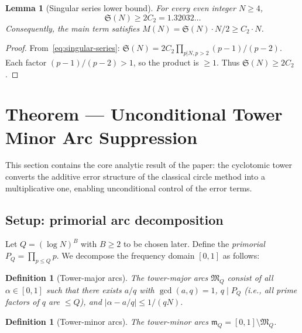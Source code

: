\documentclass[11pt,a4paper]{article}
\newtheorem{lemma}[theorem]{Lemma}
\newtheorem{definition}[theorem]{Definition}
\theoremstyle{remark}
\newcommand{\mM}{\mathfrak{M}}
\newcommand{\mm}{\mathfrak{m}}
\begin{document}
\begin{lemma}[Singular series lower bound]
\label{lem:sing-series-lb}
For every even integer $N \geq 4$,
\begin{equation}
\label{eq:SS-lower-bound}
  \mathfrak{S}(N) \geq 2C_2 = 1.32032\ldots
\end{equation}
Consequently, the main term satisfies
$M(N) = \mathfrak{S}(N) \cdot N/2 \geq C_2 \cdot N$.
\end{lemma}

\begin{proof}
From~\eqref{eq:singular-series}: $\mathfrak{S}(N) = 2C_2 \prod_{p|N, p>2}
(p-1)/(p-2)$.  Each factor $(p-1)/(p-2) > 1$, so the product is $\geq 1$.
Thus $\mathfrak{S}(N) \geq 2C_2$.
\end{proof}

\section{Theorem --- Unconditional Tower Minor Arc Suppression}
\label{sec:tower-suppression}

This section contains the core analytic result of the paper: the
cyclotomic tower converts the additive error structure of the classical
circle method into a multiplicative one, enabling unconditional control
of the error terms.

\subsection{Setup: primorial arc decomposition}
\label{subsec:primorial-arcs}

Let $Q = (\log N)^B$ with $B \geq 2$ to be chosen later.  Define the
\emph{primorial} $P_Q = \prod_{p \leq Q} p$.  We decompose the frequency
domain $[0,1]$ as follows:

\begin{definition}[Tower-major arcs]
\label{def:tower-major}
The \emph{tower-major arcs} $\mM_Q$ consist of all $\alpha \in [0,1]$
such that there exists $a/q$ with $\gcd(a,q)=1$, $q \mid P_Q$ (i.e.,
all prime factors of $q$ are $\leq Q$), and $|\alpha - a/q| \leq 1/(qN)$.
\end{definition}

\begin{definition}[Tower-minor arcs]
\label{def:tower-minor}
The \emph{tower-minor arcs} $\mm_Q = [0,1] \setminus \mM_Q$.
\end{definition}
\end{document}
